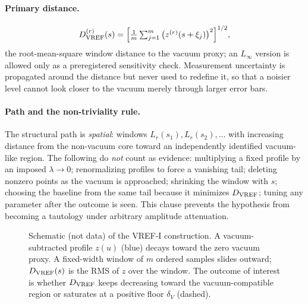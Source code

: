 \documentclass[11pt,a4paper]{article}
\theoremstyle{definition}
\theoremstyle{remark}
\begin{document}
\paragraph{Primary distance.} 
\begin{equation}
D_{\rm VREF}^{(r)}(s)=\Big[\tfrac1m\textstyle\sum_{j=1}^m\big(z^{(r)}(s+\xi_j)\big)^2\Big]^{1/2},
\end{equation}
the root-mean-square window distance to the vacuum proxy; an $L_\infty$ version is allowed only as a preregistered sensitivity check. Measurement uncertainty is propagated around the distance but never used to redefine it, so that a noisier level cannot look closer to the vacuum merely through larger error bars.

\paragraph{Path and the non-triviality rule.} The structural path is \emph{spatial}: windows $L_r(s_1),L_r(s_2),\dots$ with increasing distance from the non-vacuum core toward an independently identified vacuum-like region. The following do \emph{not} count as evidence: multiplying a fixed profile by an imposed $\lambda\to0$; renormalizing profiles to force a vanishing tail; deleting nonzero points as the vacuum is approached; shrinking the window with $s$; choosing the baseline from the same tail because it minimizes $D_{\rm VREF}$; tuning any parameter after the outcome is seen. This clause prevents the hypothesis from becoming a tautology under arbitrary amplitude attenuation.

\begin{figure}[t]
\centering
{}
\caption{Schematic (not data) of the VREF-I construction. A vacuum-subtracted profile $z(u)$ (blue) decays toward the zero vacuum proxy. A fixed-width window of $m$ ordered samples slides outward; $D_{\rm VREF}(s)$ is the RMS of $z$ over the window. The outcome of interest is whether $D_{\rm VREF}$ keeps decreasing toward the vacuum-compatible region or saturates at a positive floor $\delta_V$ (dashed).}\label{fig:vref}
\end{figure}
\end{document}
